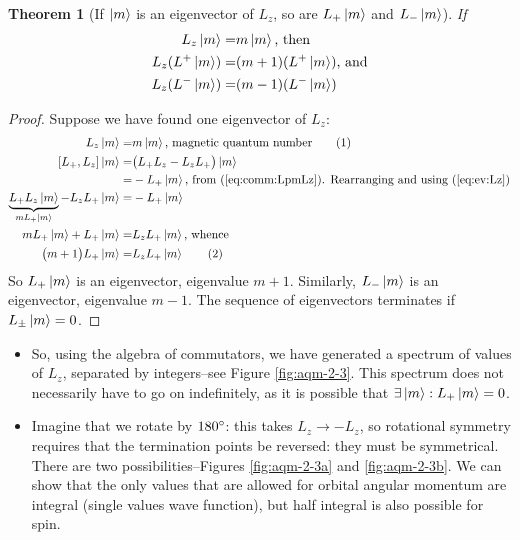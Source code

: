 \documentclass[]{article}
\newcommand\numberthis{\addtocounter{equation}{1}\tag{\theequation}}
\newtheorem{thm}{Theorem}
\begin{document}
\begin{thm}[If $\ket{m}$ is an eigenvector of $L_z$, so are $L_+ \ket{m}$ and $L_- \ket{m}$]
	If 
	\begin{align*}
		L_z \ket{m} =& m \ket{m} \text{, then }\\
		L_z (L^+ \ket{m}) =& (m+1) (L^+\ket{m}) \text{, and}\\
		L_z (L^- \ket{m}) =& (m-1) (L^-\ket{m})
	\end{align*}
\end{thm}
\begin{proof}
	Suppose we have found one eigenvector of $L_z$:
	\begin{align*}
		L_z \ket{m} =& m \ket{m} \text{, magnetic quantum number}\numberthis \label{eq:ev:Lz}\\
		[L_+,L_z] \ket{m} =& \big(L_+L_z - L_zL_+\big) \ket{m}\\
		=&- L_+ \ket{m} \text{, from (\ref{eq:comm:LpmLz}). Rearranging  and using (\ref{eq:ev:Lz})}\\
		\underbrace{L_+L_z \ket{m}}_{m L_+\ket{m}} - L_zL_+ \ket{m} =&- L_+ \ket{m}\\
		m L_+\ket{m} + L_+\ket{m} =& L_z L_+ \ket{m} \text{, whence}\\
		\big(m + 1 \big)L_+\ket{m}  =& L_z L_+ \ket{m} \numberthis \label{eq:create_m}
	\end{align*}
	So $L_+ \ket{m}$ is an eigenvector, eigenvalue $m+1$.
	Similarly, $L_- \ket{m}$ is an eigenvector, eigenvalue $m-1$. The sequence of eigenvectors terminates if  $L_{\pm} \ket{m}=0$.
\end{proof}

\begin{itemize}
	\item So, using the algebra of commutators, we have generated a spectrum of values of $L_z$, separated by integers--see Figure \ref{fig:aqm-2-3}. This spectrum does not necessarily have to go on indefinitely, as it is possible that $\exists  \ket{m}: L_+ \ket{m} = 0$.
	\item Imagine that we rotate by $180\degree$: this takes $L_z\rightarrow - L_z$, so rotational symmetry requires that the termination points be reversed: they must be symmetrical. There are two possibilities--Figures \ref{fig:aqm-2-3a} and \ref{fig:aqm-2-3b}. We can show that the only values that are allowed for orbital angular momentum are integral (single values wave function), but half integral is also possible for spin. 
\end{itemize}
\end{document}
